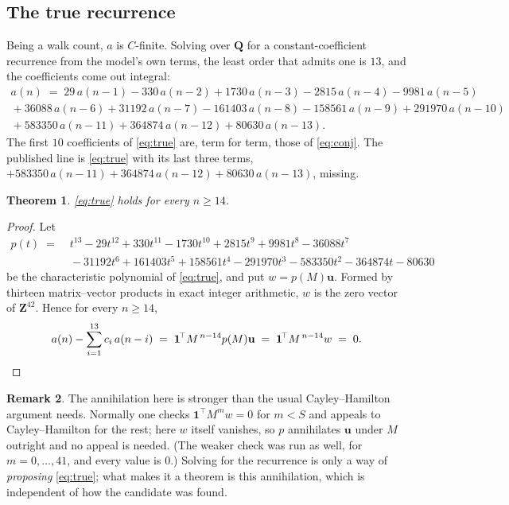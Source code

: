 \documentclass[11pt,a4paper]{article}
\theoremstyle{plain}
\newtheorem{theorem}{Theorem}
\theoremstyle{definition}
\newtheorem{remark}[theorem]{Remark}
\begin{document}
\subsection{The true recurrence}

Being a walk count, $a$ is $C$-finite. Solving over $\mathbf Q$ for a
constant-coefficient recurrence from the model's own terms, the least order that admits
one is $13$, and the coefficients come out integral:
\begin{multline}\label{eq:true}
a(n)\;=\;29\,a(n-1) - 330\,a(n-2) + 1730\,a(n-3) - 2815\,a(n-4) - 9981\,a(n-5)\\
{}+ 36088\,a(n-6) + 31192\,a(n-7) - 161403\,a(n-8) - 158561\,a(n-9) + 291970\,a(n-10)\\
{}+ 583350\,a(n-11) + 364874\,a(n-12) + 80630\,a(n-13).
\end{multline}
The first $10$ coefficients of \eqref{eq:true} are, term for term, those of
\eqref{eq:conj}. The published line is \eqref{eq:true} with its last three terms,
$+583350\,a(n-11)+364874\,a(n-12)+80630\,a(n-13)$, missing.

\begin{theorem}\label{thm:true}
\eqref{eq:true} holds for every $n\ge14$.
\end{theorem}

\begin{proof}
Let
\begin{align*}
p(t)\;=\;&t^{13}-29t^{12}+330t^{11}-1730t^{10}+2815t^{9}+9981t^{8}-36088t^{7}\\
&{}-31192t^{6}+161403t^{5}+158561t^{4}-291970t^{3}-583350t^{2}-364874t-80630
\end{align*}
be the characteristic polynomial of \eqref{eq:true}, and put $w=p(M)\mathbf u$. Formed by
thirteen matrix--vector products in exact integer arithmetic, $w$ is the zero vector of
$\mathbf Z^{42}$. Hence for every $n\ge14$,
\[
a(n)-\sum_{i=1}^{13}c_i\,a(n-i)\;=\;\mathbf 1^{\!\top}M^{\,n-14}p(M)\mathbf u
\;=\;\mathbf 1^{\!\top}M^{\,n-14}w\;=\;0 . \qedhere
\]
\end{proof}

\begin{remark}
The annihilation here is stronger than the usual Cayley--Hamilton argument needs. Normally
one checks $\mathbf 1^{\!\top}M^{m}w=0$ for $m<S$ and appeals to Cayley--Hamilton for the
rest; here $w$ itself vanishes, so $p$ annihilates $\mathbf u$ under $M$ outright and no
appeal is needed. (The weaker check was run as well, for $m=0,\dots,41$, and every value
is $0$.) Solving for the recurrence is only a way of \emph{proposing} \eqref{eq:true};
what makes it a theorem is this annihilation, which is independent of how the candidate
was found.
\end{remark}
\end{document}
